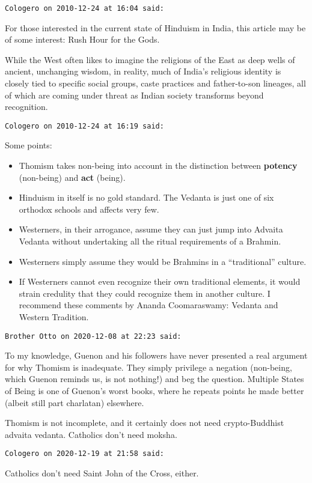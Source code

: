 \begin{footnotesize}
\begin{sffamily}
\texttt{Cologero on 2010-12-24 at 16:04 said: }

For those interested in the current state of Hinduism in India, this article may be of some interest: Rush Hour for the Gods.

\begin{quotex}
While the West often likes to imagine the religions of the East as deep wells of ancient, unchanging wisdom, in reality, much of India's religious identity is closely tied to specific social groups, caste practices and father-to-son lineages, all of which are coming under threat as Indian society transforms beyond recognition.

\end{quotex}

\hfill

\texttt{Cologero on 2010-12-24 at 16:19 said: }

Some points:

\begin{itemize}
\item Thomism takes non-being into account in the distinction between \textbf{potency} (non-being) and \textbf{act} (being). 
\item Hinduism in itself is no gold standard. The Vedanta is just one of six orthodox schools and affects very few. 
\item Westerners, in their arrogance, assume they can just jump into Advaita Vedanta without undertaking all the ritual requirements of a Brahmin. 
\item Westerners simply assume they would be Brahmins in a “traditional” culture. 
\item If Westerners cannot even recognize their own traditional elements, it would strain credulity that they could recognize them in another culture. I recommend these comments by Ananda Coomaraswamy: Vedanta and Western Tradition. 
\end{itemize}

\hfill

\texttt{Brother Otto on 2020-12-08 at 22:23 said: }

To my knowledge, Guenon and his followers have never presented a real argument for why Thomism is inadequate. They simply privilege a negation (non-being, which Guenon reminds us, is not nothing!) and beg the question. Multiple States of Being is one of Guenon's worst books, where he repeats points he made better (albeit still part charlatan) elsewhere.

Thomism is not incomplete, and it certainly does not need crypto-Buddhist advaita vedanta. Catholics don't need moksha.

\hfill

\texttt{Cologero on 2020-12-19 at 21:58 said: }

Catholics don’t need Saint John of the Cross, either.

\end{sffamily}\end{footnotesize}
